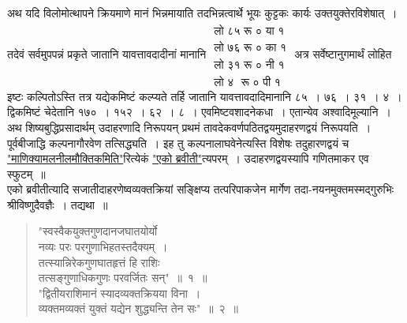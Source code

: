 \documentclass[11pt, openany]{book}
\begin{document}
\vspace{-3mm}
 अथ यदि विलोमोत्थापने क्रियमाणे मानं भिन्नमायाति तदभिन्नत्वार्थे भूयः कुट्टकः कार्यः उक्तयुक्तेरविशेषात्~। तदेवं सर्वमुपपन्नं प्रकृते जातानि यावत्तावदादीनां मानानि 
$\begin{matrix}
\mbox{लो ८५ रू ० या १}\\
\mbox{लो ७६ रू ० का १}\\
\mbox{लो ३१ रू ० नी १}\\
\mbox{लो ४ ~रू ० पी १}
\end{matrix}$ अत्र सर्वेष्टानुगमार्थं लोहित इष्टः कल्पितोऽस्ति तत्र यद्येकमिष्टं कल्प्यते तर्हि जातानि यावत्तावदादिमानानि ८५~। ७६~। ३१~। ४~। द्विकमिष्टं चेदेतानि १७०~।
 \newpage%
\noindent १५२~। ६२~। ८~। एवमिष्टवशादनेकधा~। एतान्येव अश्वादिमूल्यानि~। अथ शिष्यबुद्धिप्रसादार्थम् उदाहरणादि निरूपयन् प्रथमं तावदेकवर्णपठितद्वयमुदाहरणद्वयं निरूपयति~। पूर्वबीजाद्धि कल्पनागौरवेण तत्सिद्ध्यति~। इह तु कल्पनालाघवेनेत्यस्ति विशेषः तदुहारणद्वयं च \hyperref[Ex 39]{"माणिक्यामलनीलमौक्तिकमिति"}रित्येकं \hyperref[Ex 40]{"एको ब्रवीती"}त्यपरम्~। उदाहरणद्वयस्यापि गणितमाकर एव स्फुटम्~॥ \\

\vspace{-3mm}
 एको ब्रवीतीत्यादि सजातीदाहरणेष्वव्यक्तक्रियां सङ्क्षिप्य तत्परिपाकजेन 
मार्गेण तदा-नयनमुक्तमस्मद्गुरुभिः श्रीविष्णुदैवज्ञैः~। तद्यथा~॥ 
\begin{quote}
    \q
     "स्वस्वैकयुक्तगुणदानजघातयोर्यो \\

\vspace{-7mm}
\hspace{1cm} नव्यः परः परगुणाभिहतस्तदैक्यम्~। \\

\vspace{-7mm}
\hspace{1mm} तत्स्यान्निरेकगुणघातहृत्तं हि राशिः \\

\vspace{-7mm}
\hspace{1cm} तत्सङ्गुणाधिकगुणः परवर्जितः सन्"~॥~१~॥~\\

\vspace{-5mm}
 "द्वितीयराशिमानं स्यादव्यक्तक्रियया विना~। \\

\vspace{-7mm}
\hspace{1mm} व्यक्तमव्यक्तं युक्तं यद्येन शुद्ध्यन्ति तेन सः"~॥~२~॥~
\end{quote}
\end{document}

